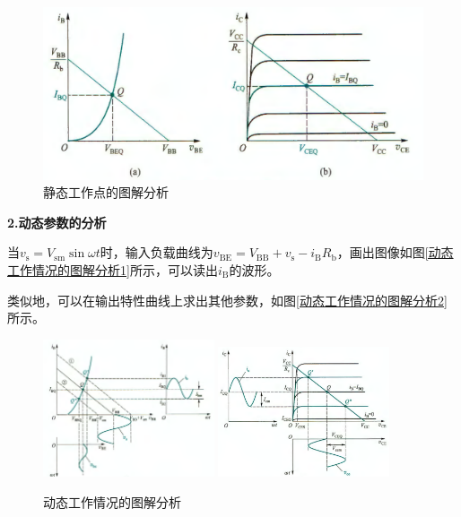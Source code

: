 \begin{figure}[htb]
    \centering
    \includegraphics[width=0.8\linewidth]{pic/静态工作点的图解分析.png}
    \caption{静态工作点的图解分析\cite{康华光}\label{静态工作点的图解分析}}
\end{figure}

\textbf{2.动态参数的分析}

当$v_{\mathrm{s}}=V_{\mathrm{sm}}\sin \omega t$时，输入负载曲线为$v_{\mathrm{BE}}=V_{\mathrm{BB}}+v_{\mathrm{s}}-i_{\mathrm{B}}R_{\mathrm{b}}$，画出图像如图\ref{动态工作情况的图解分析1}所示，可以读出$i_{\mathrm{B}}$的波形。

类似地，可以在输出特性曲线上求出其他参数，如图\ref{动态工作情况的图解分析2}所示。

\begin{figure}[htb]
    \centering
        {\includegraphics[width=0.45\textwidth]{pic/动态工作情况的图解分析1.png}}\qquad
        {\includegraphics[width=0.45\textwidth]{pic/动态工作情况的图解分析2.png}}
        \caption{动态工作情况的图解分析\label{动态工作情况的图解分析}}
\end{figure}

